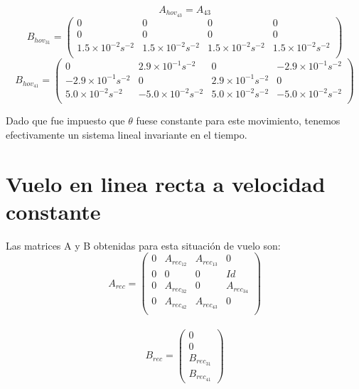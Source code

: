 \begin{equation}
A_{hov_{43}} = A_{43}
\end{equation}
\begin{equation}
B_{hov_{31}}=\left(\begin{array}{cccc}
0&0&0&0\\
0&0&0&0\\
1.5\times10^{-2}s^{-2} &1.5\times10^{-2}s^{-2} & 1.5\times10^{-2}s^{-2}& 1.5\times10^{-2}s^{-2} \\
\end{array}\right) 
\end{equation}
\begin{equation}
B_{hov_{41}}=\left(\begin{array}{cccc}
0 & 2.9\times10^{-1}s^{-2} & 0 &-2.9\times10^{-1}s^{-2} \\
-2.9\times10^{-1}s^{-2} &0& 2.9\times10^{-1}s^{-2} &0\\
5.0\times10^{-2}s^{-2} & -5.0\times10^{-2}s^{-2} &5.0\times10^{-2}s^{-2} &-5.0\times10^{-2}s^{-2}\\
\end{array}\right)
\end{equation}

Dado que fue impuesto que $\theta$ fuese constante para este movimiento, tenemos efectivamente un sistema lineal invariante en el tiempo.

\section{Vuelo en linea recta a velocidad constante}

Las matrices A y B obtenidas para esta situaci\'on de vuelo son:
\begin{equation}
\label{eq:Arec}
A_{rec}=\left(\begin{array}{cccc}
0 & A_{rec_{12}} & A_{rec_{13}} & 0 \\
0 & 0 & 0      & Id\\
0 & A_{rec_{32}} & 0 & A_{rec_{34}}\\
0 &  A_{rec_{42}}       &  A_{rec_{43}}  & 0 \\    
\end{array}\right)
\end{equation}\\


\begin{equation}
\label{eq:Brec}
B_{rec}=\left(\begin{array}{c}
0\\
0\\
B_{rec_{31}}\\
B_{rec_{41}} 
\end{array}\right)
\end{equation}\\

